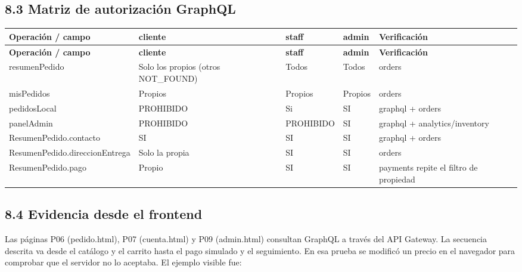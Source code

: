 \documentclass[10pt,letterpaper]{article}
\begin{document}
\subsection*{8.3 Matriz de autorización GraphQL}
{\footnotesize
\begin{longtable}{|P{\tabcolsep\relax}|P{\tabcolsep\relax}|P{\tabcolsep\relax}|P{\tabcolsep\relax}|P{\tabcolsep\relax}|}
\hline
\textbf{Operación /\allowbreak{} campo} & \textbf{cliente} & \textbf{staff} & \textbf{admin} & \textbf{Verificación} \\ \hline
\endfirsthead
\hline
\textbf{Operación /\allowbreak{} campo} & \textbf{cliente} & \textbf{staff} & \textbf{admin} & \textbf{Verificación} \\ \hline
\endhead
resumenPedido & Solo los propios (otros NOT\_\allowbreak{}FOUND) & Todos & Todos & orders\\ \hline
misPedidos & Propios & Propios & Propios & orders \\ \hline
pedidosLocal & PROHIBIDO & Si & SI & graphql + orders \\ \hline
panelAdmin  & PROHIBIDO & PROHIBIDO & SI & graphql + analytics/\allowbreak{}inventory \\ \hline
ResumenPedido.\allowbreak{}contacto & SI & SI & SI & graphql + orders  \\ \hline
ResumenPedido.\allowbreak{}direccionEntrega & Solo la propia & SI & SI & orders \\ \hline
ResumenPedido.\allowbreak{}pago & Propio & SI & SI & payments repite el filtro de propiedad \\ \hline
\end{longtable}}

\subsection*{8.4 Evidencia desde el frontend}
Las páginas P06 (pedido.\allowbreak{}html), P07 (cuenta.\allowbreak{}html) y P09 (admin.\allowbreak{}html) consultan GraphQL a través del API Gateway. La secuencia descrita va desde el catálogo y el carrito hasta el pago simulado y el seguimiento. En esa prueba se modificó un precio en el navegador para comprobar que el servidor no lo aceptaba. El ejemplo visible fue:
\end{document}
